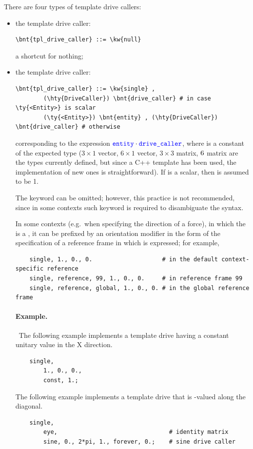 There are four types of template drive callers:
\begin{itemize}
\item the  template drive caller:
\begin{Verbatim}[commandchars=\\\{\}]
    \bnt{tpl_drive_caller} ::= \kw{null}
\end{Verbatim}
a shortcut for nothing;
\item the  template drive caller:
\begin{Verbatim}[commandchars=\\\{\}]
    \bnt{tpl_drive_caller} ::= \kw{single} ,
        (\hty{DriveCaller}) \bnt{drive_caller} # in case \ty{<Entity>} is scalar
        (\ty{<Entity>}) \bnt{entity} , (\hty{DriveCaller}) \bnt{drive_caller} # otherwise
\end{Verbatim}
corresponding to the expression $\textcolor{blue}{\texttt{entity}} \cdot \textcolor{blue}{\texttt{drive\_caller}}$,
where  is a constant of the expected type ($3 \times 1$ 
vector, $6 \times 1$ vector, $3 \times 3$ matrix, $6 \time 6$ matrix
are the types currently defined, but since 
a C++ template has been used, the implementation of new ones 
is straightforward).
If  is a scalar, then  is assumed to be 1.

\begin{framed}
The keyword  can be omitted; however, this practice is not recommended,
since in some contexts such keyword is required to disambiguate the syntax.
\end{framed}

In some contexts (e.g.\ when specifying the direction of a force),
in which the  is a , it can be prefixed
by an orientation modifier in the form of the specification
of a reference frame in which  is expressed; for example,
\begin{verbatim}
    single, 1., 0., 0.                    # in the default context-specific reference 
    single, reference, 99, 1., 0., 0.     # in reference frame 99
    single, reference, global, 1., 0., 0. # in the global reference frame
\end{verbatim}

\paragraph{Example.} \
The following example implements a  template drive having a constant unitary value in the X direction.
\begin{verbatim}
    single,
        1., 0., 0.,
        const, 1.;
\end{verbatim}
The following example implements a  template drive that is -valued along the diagonal.
\begin{verbatim}
    single,
        eye,                                # identity matrix
        sine, 0., 2*pi, 1., forever, 0.;    # sine drive caller
\end{verbatim}


\end{itemize}
